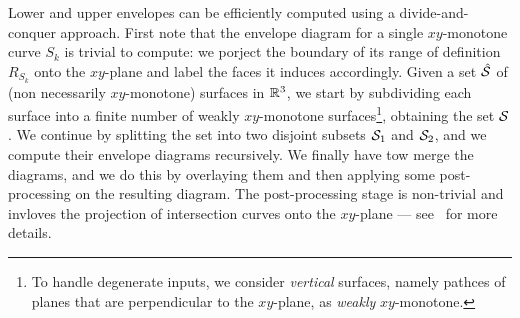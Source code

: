 Lower and upper envelopes can be efficiently computed using a
divide-and-conquer approach. First note that the envelope diagram for
a single $xy$-monotone curve $S_k$ is trivial to compute: we porject
the boundary of its range of definition $R_{S_k}$ onto the $xy$-plane
and label the faces it induces accordingly. Given a set $\hat{{\cal S}}$
of (non necessarily $xy$-monotone) surfaces in $\mathbb{R}^3$, we start by
subdividing each surface into a finite number of weakly $xy$-monotone
surfaces\footnote{To handle degenerate inputs, we consider {\em vertical}
surfaces, namely pathces of planes that are perpendicular to the
$xy$-plane, as {\em weakly} $xy$-monotone.}, obtaining the set ${\cal S}$.
We continue by splitting the set into two disjoint subsets ${\cal S}_1$
and ${\cal S}_2$, and we compute their envelope diagrams recursively.
We finally have tow merge the diagrams, and we do this by overlaying
them and then applying some post-processing on the resulting diagram.
The post-processing stage is non-trivial and invloves the projection
of intersection curves onto the $xy$-plane --- 
see~\cite{Michals_thesis} for more details.
